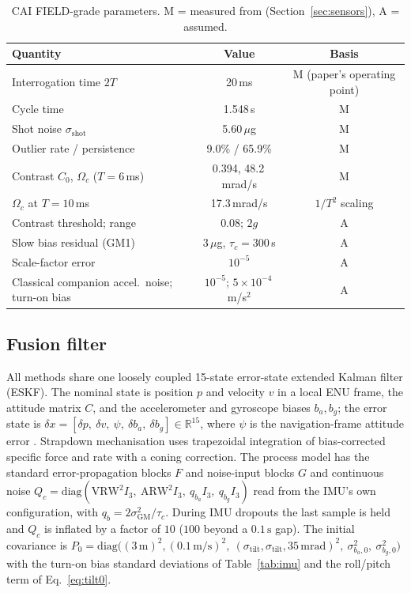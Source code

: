 \documentclass[journal]{IEEEtran}
\begin{document}
\begin{table}[t]
\centering
\caption{CAI FIELD-grade parameters. M = measured from \cite{darmagnac2024atom,darmagnac2024dataset}
(Section~\ref{sec:sensors}), A = assumed.}
\label{tab:cai}
\small
\begin{tabular}{lcc}
\toprule
Quantity & Value & Basis \\
\midrule
Interrogation time $2T$ & 20\,ms & M (paper's operating point) \\
Cycle time & 1.548\,s & M \\
Shot noise $\sigma_{\mathrm{shot}}$ & 5.60\,$\mu$g & M \\
Outlier rate / persistence & 9.0\% / 65.9\% & M \\
Contrast $C_0$, $\Omega_c$ ($T{=}6$\,ms) & 0.394, 48.2\,mrad/s & M \\
$\Omega_c$ at $T{=}10$\,ms & 17.3\,mrad/s & $1/T^2$ scaling \\
Contrast threshold; range & 0.08; $2g$ & A \\
Slow bias residual (GM1) & 3\,$\mu$g, $\tau_c{=}300$\,s & A \\
Scale-factor error & $10^{-5}$ & A \\
Classical companion accel.\ noise; turn-on bias & $10^{-5}$; $5{\times}10^{-4}$\,m/s$^2$ & A \\
\bottomrule
\end{tabular}
\end{table}

\subsection{Fusion filter}
\label{sec:fusion}
All methods share one loosely coupled 15-state error-state extended Kalman filter (ESKF). The nominal state
is position $p$ and velocity $v$ in a local ENU frame, the attitude matrix $C$, and the accelerometer and
gyroscope biases $b_a, b_g$; the error state is
$\delta x = [\delta p,\ \delta v,\ \psi,\ \delta b_a,\ \delta b_g] \in \mathbb{R}^{15}$, where $\psi$ is the
navigation-frame attitude error \cite{sola2017quaternion}. Strapdown mechanisation uses trapezoidal integration
of bias-corrected specific force and rate with a coning correction. The process model has the standard
error-propagation blocks $F$ and noise-input blocks $G$ and continuous noise
$Q_c = \mathrm{diag}(\mathrm{VRW}^2 I_3,\ \mathrm{ARW}^2 I_3,\ q_{b_a} I_3,\ q_{b_g} I_3)$ read from the IMU's
own configuration, with $q_b = 2\sigma_{\mathrm{GM}}^2/\tau_c$. During IMU dropouts the last sample is held
and $Q_c$ is inflated by a factor of $10$ ($100$ beyond a $0.1\,\mathrm{s}$ gap). The initial covariance is
$P_0 = \mathrm{diag}\big((3\,\mathrm{m})^2, (0.1\,\mathrm{m/s})^2,\ (\sigma_{\mathrm{tilt}},\sigma_{\mathrm{tilt}},35\,\mathrm{mrad})^2,\ \sigma_{b_a,0}^2,\ \sigma_{b_g,0}^2\big)$
with the turn-on bias standard deviations of Table~\ref{tab:imu} and the roll/pitch term of
Eq.~\eqref{eq:tilt0}.
\end{document}
